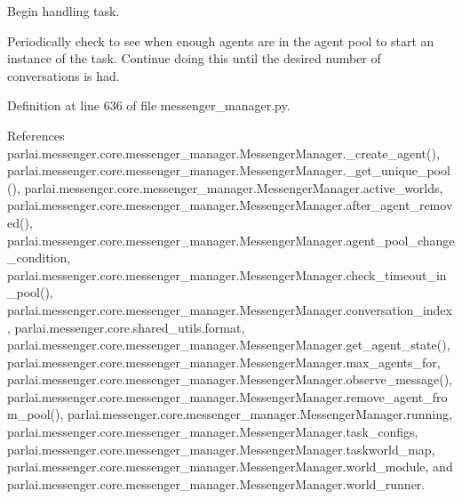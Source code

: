 \begin{DoxyVerb}Begin handling task.

Periodically check to see when enough agents are in the agent pool
to start an instance of the task. Continue doing this until the desired
number of conversations is had.
\end{DoxyVerb}
 

Definition at line 636 of file messenger\+\_\+manager.\+py.



References parlai.\+messenger.\+core.\+messenger\+\_\+manager.\+Messenger\+Manager.\+\_\+create\+\_\+agent(), parlai.\+messenger.\+core.\+messenger\+\_\+manager.\+Messenger\+Manager.\+\_\+get\+\_\+unique\+\_\+pool(), parlai.\+messenger.\+core.\+messenger\+\_\+manager.\+Messenger\+Manager.\+active\+\_\+worlds, parlai.\+messenger.\+core.\+messenger\+\_\+manager.\+Messenger\+Manager.\+after\+\_\+agent\+\_\+removed(), parlai.\+messenger.\+core.\+messenger\+\_\+manager.\+Messenger\+Manager.\+agent\+\_\+pool\+\_\+change\+\_\+condition, parlai.\+messenger.\+core.\+messenger\+\_\+manager.\+Messenger\+Manager.\+check\+\_\+timeout\+\_\+in\+\_\+pool(), parlai.\+messenger.\+core.\+messenger\+\_\+manager.\+Messenger\+Manager.\+conversation\+\_\+index, parlai.\+messenger.\+core.\+shared\+\_\+utils.\+format, parlai.\+messenger.\+core.\+messenger\+\_\+manager.\+Messenger\+Manager.\+get\+\_\+agent\+\_\+state(), parlai.\+messenger.\+core.\+messenger\+\_\+manager.\+Messenger\+Manager.\+max\+\_\+agents\+\_\+for, parlai.\+messenger.\+core.\+messenger\+\_\+manager.\+Messenger\+Manager.\+observe\+\_\+message(), parlai.\+messenger.\+core.\+messenger\+\_\+manager.\+Messenger\+Manager.\+remove\+\_\+agent\+\_\+from\+\_\+pool(), parlai.\+messenger.\+core.\+messenger\+\_\+manager.\+Messenger\+Manager.\+running, parlai.\+messenger.\+core.\+messenger\+\_\+manager.\+Messenger\+Manager.\+task\+\_\+configs, parlai.\+messenger.\+core.\+messenger\+\_\+manager.\+Messenger\+Manager.\+taskworld\+\_\+map, parlai.\+messenger.\+core.\+messenger\+\_\+manager.\+Messenger\+Manager.\+world\+\_\+module, and parlai.\+messenger.\+core.\+messenger\+\_\+manager.\+Messenger\+Manager.\+world\+\_\+runner.

